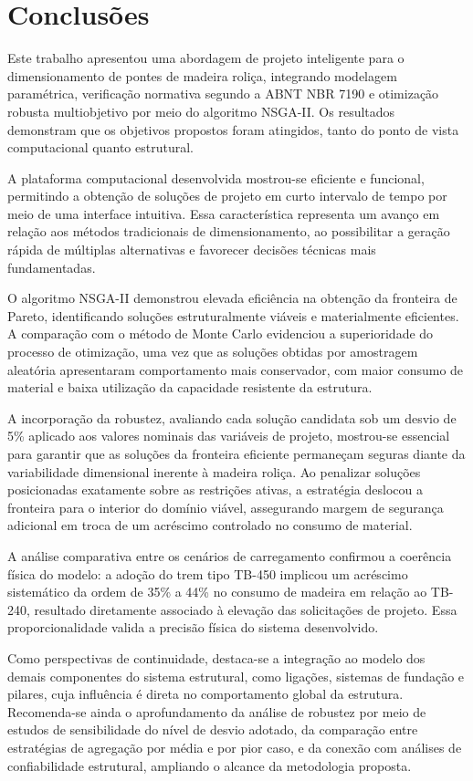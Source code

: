 \section{Conclusões}\label{sec:conclusoes}

Este trabalho apresentou uma abordagem de projeto inteligente para o dimensionamento de pontes de madeira roliça, integrando modelagem paramétrica, verificação normativa segundo a ABNT NBR 7190 e otimização robusta multiobjetivo por meio do algoritmo NSGA-II. Os resultados demonstram que os objetivos propostos foram atingidos, tanto do ponto de vista computacional quanto estrutural.

A plataforma computacional desenvolvida mostrou-se eficiente e funcional, permitindo a obtenção de soluções de projeto em curto intervalo de tempo por meio de uma interface intuitiva. Essa característica representa um avanço em relação aos métodos tradicionais de dimensionamento, ao possibilitar a geração rápida de múltiplas alternativas e favorecer decisões técnicas mais fundamentadas.

O algoritmo NSGA-II demonstrou elevada eficiência na obtenção da fronteira de Pareto, identificando soluções estruturalmente viáveis e materialmente eficientes. A comparação com o método de Monte Carlo evidenciou a superioridade do processo de otimização, uma vez que as soluções obtidas por amostragem aleatória apresentaram comportamento mais conservador, com maior consumo de material e baixa utilização da capacidade resistente da estrutura.

A incorporação da robustez, avaliando cada solução candidata sob um desvio de 5\% aplicado aos valores nominais das variáveis de projeto, mostrou-se essencial para garantir que as soluções da fronteira eficiente permaneçam seguras diante da variabilidade dimensional inerente à madeira roliça. Ao penalizar soluções posicionadas exatamente sobre as restrições ativas, a estratégia deslocou a fronteira para o interior do domínio viável, assegurando margem de segurança adicional em troca de um acréscimo controlado no consumo de material.

A análise comparativa entre os cenários de carregamento confirmou a coerência física do modelo: a adoção do trem tipo TB-450 implicou um acréscimo sistemático da ordem de 35\% a 44\% no consumo de madeira em relação ao TB-240, resultado diretamente associado à elevação das solicitações de projeto. Essa proporcionalidade valida a precisão física do sistema desenvolvido.

Como perspectivas de continuidade, destaca-se a integração ao modelo dos demais componentes do sistema estrutural, como ligações, sistemas de fundação e pilares, cuja influência é direta no comportamento global da estrutura. Recomenda-se ainda o aprofundamento da análise de robustez por meio de estudos de sensibilidade do nível de desvio adotado, da comparação entre estratégias de agregação por média e por pior caso, e da conexão com análises de confiabilidade estrutural, ampliando o alcance da metodologia proposta.
